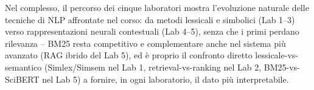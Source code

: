 \documentclass[12pt,a4paper]{article}
\begin{document}
Nel complesso, il percorso dei cinque laboratori mostra l'evoluzione naturale delle tecniche di NLP affrontate nel corso: da metodi lessicali e simbolici (Lab 1--3) verso rappresentazioni neurali contestuali (Lab 4--5), senza che i primi perdano rilevanza -- BM25 resta competitivo e complementare anche nel sistema pi\`u avanzato (RAG ibrido del Lab 5), ed \`e proprio il confronto diretto lessicale-vs-semantico (Simlex/Simsem nel Lab 1, retrieval-vs-ranking nel Lab 2, BM25-vs-SciBERT nel Lab 5) a fornire, in ogni laboratorio, il dato pi\`u interpretabile.
\end{document}
